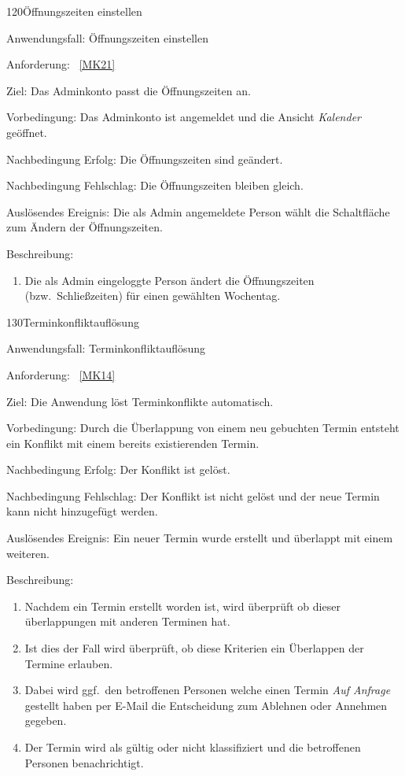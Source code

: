 \pagebreak

\begin{function}{120}{Öffnungszeiten einstellen}
    \item[Anwendungsfall:] Öffnungszeiten einstellen
    \item[Anforderung:]~\ref{MK21}
    \item[Ziel:] Das Adminkonto passt die Öffnungszeiten an.
    \item[Vorbedingung:] Das Adminkonto ist angemeldet und die Ansicht \textit{Kalender} geöffnet.
    \item[Nachbedingung Erfolg:] Die Öffnungszeiten sind geändert.
    \item[Nachbedingung Fehlschlag:] Die Öffnungszeiten bleiben gleich.
    \item[Auslösendes Ereignis:] Die als Admin angemeldete Person wählt die Schaltfläche zum Ändern der Öffnungszeiten.
    \item[Beschreibung:] ~
    \begin{enumerate}
        \item Die als Admin eingeloggte Person ändert die Öffnungszeiten (bzw.\ Schließzeiten) für einen gewählten Wochentag.
    \end{enumerate}
\end{function}

\pagebreak

\begin{function}{130}{Terminkonfliktauflösung}
    \item[Anwendungsfall:] Terminkonfliktauflösung
    \item[Anforderung:]~\ref{MK14}
    \item[Ziel:] Die Anwendung löst Terminkonflikte automatisch.
    \item[Vorbedingung:] Durch die Überlappung von einem neu gebuchten Termin entsteht ein Konflikt mit einem bereits existierenden Termin.
    \item[Nachbedingung Erfolg:] Der Konflikt ist gelöst.
    \item[Nachbedingung Fehlschlag:] Der Konflikt ist nicht gelöst und der neue Termin kann nicht hinzugefügt werden.
    \item[Auslösendes Ereignis:] Ein neuer Termin wurde erstellt und überlappt mit einem weiteren.
    \item[Beschreibung:] ~
    \begin{enumerate}
        \item Nachdem ein Termin erstellt worden ist, wird überprüft ob dieser überlappungen mit anderen Terminen hat.
        \item Ist dies der Fall wird überprüft, ob diese Kriterien ein Überlappen der Termine erlauben.
        \item Dabei wird ggf.\ den betroffenen Personen welche einen Termin \textit{Auf Anfrage} gestellt haben per E-Mail die Entscheidung zum Ablehnen oder Annehmen gegeben.
        \item Der Termin wird als gültig oder nicht klassifiziert und die betroffenen Personen benachrichtigt.
    \end{enumerate}
\end{function}